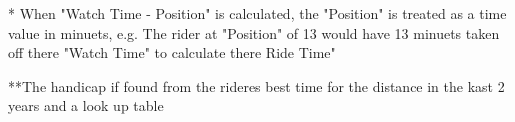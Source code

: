 * When "Watch Time - Position" is calculated, the "Position" is treated as a time value in minuets, e.g. The rider at "Position" of 13 would have 13 minuets taken off there "Watch Time" to calculate there Ride Time"

\begin{algorithm}[H]
\label{fig:Time Sort Algorithm}
	\caption{$Time Sort Algorithm$}
\begin{algorithmic}[2]
		\EndIf
	\EndFor
\EndWhile
\end{algorithmic}
\end{algorithm}

\begin{algorithm}[H]
\label{fig:Handicap Time Algorithm}
	\caption{$Handicap Time Algorithm$}
\begin{algorithmic}[3]
\end{algorithmic}
\end{algorithm}

**The handicap if found from the rideres best time for the distance in the kast 2 years and a look up table
